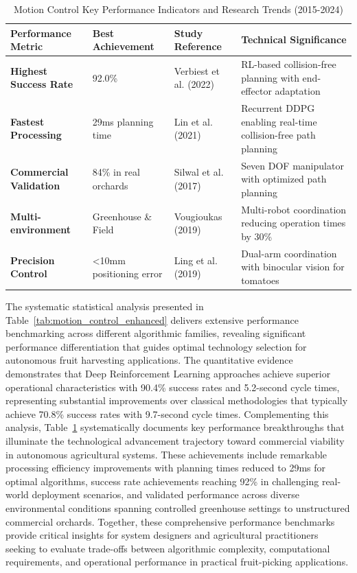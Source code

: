 \documentclass{ieeeaccess}
\begin{document}
\begin{table}[htbp]
\centering
\small
\caption{Motion Control Key Performance Indicators and Research Trends (2015-2024)}
\label{tab:motion_control_kpis}
\begin{tabular}{p{3cm}p{2.5cm}p{3cm}p{6cm}}
\toprule
\textbf{Performance Metric} & \textbf{Best Achievement} & \textbf{Study Reference} & \textbf{Technical Significance} \\
\midrule
\textbf{Highest Success Rate} & 92.0\% & Verbiest et al. (2022) & RL-based collision-free planning with end-effector adaptation \\
\midrule
\textbf{Fastest Processing} & 29ms planning time & Lin et al. (2021) & Recurrent DDPG enabling real-time collision-free path planning \\
\midrule
\textbf{Commercial Validation} & 84\% in real orchards & Silwal et al. (2017) & Seven DOF manipulator with optimized path planning \\
\midrule
\textbf{Multi-environment} & Greenhouse \& Field & Vougioukas (2019) & Multi-robot coordination reducing operation times by 30\% \\
\midrule
\textbf{Precision Control} & <10mm positioning error & Ling et al. (2019) & Dual-arm coordination with binocular vision for tomatoes \\
\bottomrule
\end{tabular}
\end{table}
\fi
The systematic statistical analysis presented in Table~\ref{tab:motion_control_enhanced} delivers extensive performance benchmarking across different algorithmic families, revealing significant performance differentiation that guides optimal technology selection for autonomous fruit harvesting applications. The quantitative evidence demonstrates that Deep Reinforcement Learning approaches achieve superior operational characteristics with 90.4\% success rates and 5.2-second cycle times, representing substantial improvements over classical methodologies that typically achieve 70.8\% success rates with 9.7-second cycle times. Complementing this analysis, Table~\ref{tab:motion_control_kpis} systematically documents key performance breakthroughs that illuminate the technological advancement trajectory toward commercial viability in autonomous agricultural systems. These achievements include remarkable processing efficiency improvements with planning times reduced to 29ms for optimal algorithms, success rate achievements reaching 92\% in challenging real-world deployment scenarios, and validated performance across diverse environmental conditions spanning controlled greenhouse settings to unstructured commercial orchards. Together, these comprehensive performance benchmarks provide critical insights for system designers and agricultural practitioners seeking to evaluate trade-offs between algorithmic complexity, computational requirements, and operational performance in practical fruit-picking applications.
\end{document}
